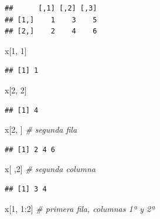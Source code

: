 \documentclass[
]{book}
\newenvironment{Shaded}{\begin{snugshade}}{\end{snugshade}}
\newcommand{\CommentTok}[1]{\textcolor[rgb]{0.56,0.35,0.01}{\textit{#1}}}
\newcommand{\DecValTok}[1]{\textcolor[rgb]{0.00,0.00,0.81}{#1}}
\newcommand{\NormalTok}[1]{#1}
\newcommand{\SpecialCharTok}[1]{\textcolor[rgb]{0.00,0.00,0.00}{#1}}
\theoremstyle{break}
\theoremstyle{nonumberplain}
\begin{document}
\begin{verbatim}
##      [,1] [,2] [,3]
## [1,]    1    3    5
## [2,]    2    4    6
\end{verbatim}

\begin{Shaded}
\begin{Highlighting}[]
\NormalTok{x[}\DecValTok{1}\NormalTok{, }\DecValTok{1}\NormalTok{]}
\end{Highlighting}
\end{Shaded}

\begin{verbatim}
## [1] 1
\end{verbatim}

\begin{Shaded}
\begin{Highlighting}[]
\NormalTok{x[}\DecValTok{2}\NormalTok{, }\DecValTok{2}\NormalTok{]}
\end{Highlighting}
\end{Shaded}

\begin{verbatim}
## [1] 4
\end{verbatim}

\begin{Shaded}
\begin{Highlighting}[]
\NormalTok{x[}\DecValTok{2}\NormalTok{, ]  }\CommentTok{\# segunda fila}
\end{Highlighting}
\end{Shaded}

\begin{verbatim}
## [1] 2 4 6
\end{verbatim}

\begin{Shaded}
\begin{Highlighting}[]
\NormalTok{x[ ,}\DecValTok{2}\NormalTok{]  }\CommentTok{\# segunda columna}
\end{Highlighting}
\end{Shaded}

\begin{verbatim}
## [1] 3 4
\end{verbatim}

\begin{Shaded}
\begin{Highlighting}[]
\NormalTok{x[}\DecValTok{1}\NormalTok{, }\DecValTok{1}\SpecialCharTok{:}\DecValTok{2}\NormalTok{]  }\CommentTok{\# primera fila, columnas 1ª y 2ª }
\end{Highlighting}
\end{Shaded}
\end{document}
